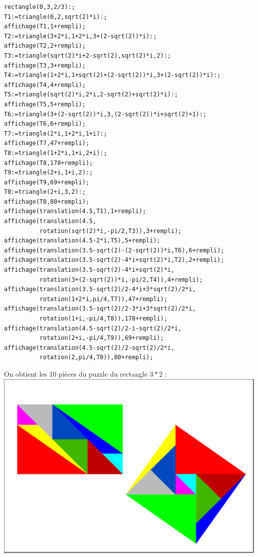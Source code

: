 \documentclass[a4paper,11pt]{book}
\begin{document}
\begin{verbatim}
rectangle(0,3,2/3):;
T1:=triangle(0,2,sqrt(2)*i):;
affichage(T1,1+rempli);
T2:=triangle(3+2*i,1+2*i,3+(2-sqrt(2))*i):;
affichage(T2,2+rempli);
T3:=triangle(sqrt(2)*i+2-sqrt(2),sqrt(2)*i,2):;
affichage(T3,3+rempli);
T4:=triangle(1+2*i,1+sqrt(2)+(2-sqrt(2))*i,3+(2-sqrt(2))*i):;
affichage(T4,4+rempli);
T5:=triangle(sqrt(2)*i,2*i,2-sqrt(2)+sqrt(2)*i):;
affichage(T5,5+rempli);
T6:=triangle(3+(2-sqrt(2))*i,3,(2-sqrt(2))*i+sqrt(2)+1):;
affichage(T6,6+rempli);
T7:=triangle(2*i,1+2*i,1+i):;
affichage(T7,47+rempli);
T8:=triangle(1+2*i,1+i,2+i):;
affichage(T8,178+rempli);
T9:=triangle(2+i,1+i,2):;
affichage(T9,69+rempli);
T0:=triangle(2+i,3,2):;
affichage(T0,80+rempli);
affichage(translation(4.5,T1),1+rempli);
affichage(translation(4.5,
          rotation(sqrt(2)*i,-pi/2,T3)),3+rempli);
affichage(translation(4.5-2*i,T5),5+rempli);
affichage(translation(3.5-sqrt(2)-(2-sqrt(2))*i,T6),6+rempli);
affichage(translation(3.5-sqrt(2)-4*i+sqrt(2)*i,T2),2+rempli);
affichage(translation(3.5-sqrt(2)-4*i+sqrt(2)*i,
          rotation(3+(2-sqrt(2))*i,-pi/2,T4)),4+rempli);
affichage(translation(3.5-sqrt(2)/2-4*i+3*sqrt(2)/2*i,
          rotation(1+2*i,pi/4,T7)),47+rempli);
affichage(translation(3.5-sqrt(2)/2-3*i+3*sqrt(2)/2*i,
          rotation(1+i,-pi/4,T8)),178+rempli);
affichage(translation(4.5-sqrt(2)/2-i-sqrt(2)/2*i,
          rotation(2+i,-pi/4,T9)),69+rempli);
affichage(translation(4.5-sqrt(2)/2-sqrt(2)/2*i,
          rotation(2,pi/4,T0)),80+rempli);
\end{verbatim}
On obtient les 10 pi\`eces du puzzle du rectangle $3*2$ :\\
\includegraphics[width=\textwidth]{carresqrt60}
\end{document}
